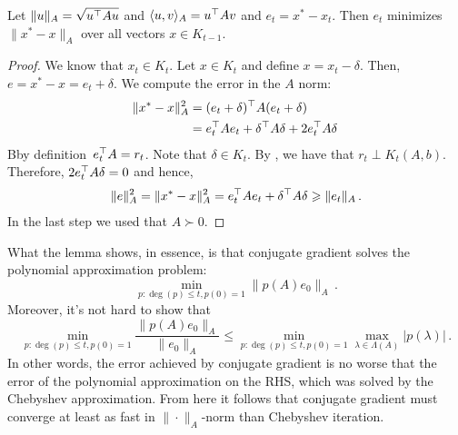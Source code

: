 \begin{lemma}
Let $\|u\|_A = \sqrt{u^\top A u}$ and $\langle u,v\rangle_A = u^\top A v$ and 
$e_t = x^* - x_t$. Then $e_t$ minimizes $\|x^* - x\|_A$ over all vectors $x \in K_{t-1}$.
\end{lemma}

\begin{proof}
We know that $x_t \in K_t$. Let $x \in K_t$ and define $x = x_t - \delta$. 
Then, $e = x^* - x = e_t + \delta.$
We compute the error in the $A$ norm:
\begin{align*}
\|x^* - x\|_A^2 
&= (e_t + \delta)^{\top} A(e_t + \delta) \\
&= e_t^{\top}Ae_t + \delta^{\top}A\delta + 2e_t^{\top} A \delta\,
\end{align*}
Bby definition~$e_t^{\top}A = r_t$.
Note that $\delta \in K_t.$ 
By , we have that $r_t \perp K_t(A,b).$
Therefore, $2e_t^{\top} A \delta = 0$ and hence, 
\begin{align*}
\|e\|_A^2
= \|x^* - x\|_A^2 
= e_t^{\top}Ae_t + \delta^{\top}A\delta
\geqslant \|e_t\|_A\,.
\end{align*}
In the last step we used that $A\succ0.$
\end{proof}

What the lemma shows, in essence, is that conjugate gradient solves the
polynomial approximation problem:
\[
\min_{p\colon\deg(p)\le t, p(0)=1} \|p(A)e_0\|_A\,.
\]
Moreover, it's not hard to show that
\[
\min_{p\colon\deg(p)\le t, p(0)=1} 
\frac{\|p(A)e_0\|_A}{\|e_0\|_A}
\le 
\min_{p\colon\deg(p)\le t, p(0)=1} 
\max_{\lambda\in\Lambda(A)}\left| p(\lambda)\right|\,.
\]
In other words, the error achieved by conjugate gradient is no worse that the
error of the polynomial approximation on the RHS, which was solved by the
Chebyshev approximation. From here it follows that conjugate gradient must
converge at least as fast in $\|\cdot\|_A$-norm than Chebyshev iteration.

